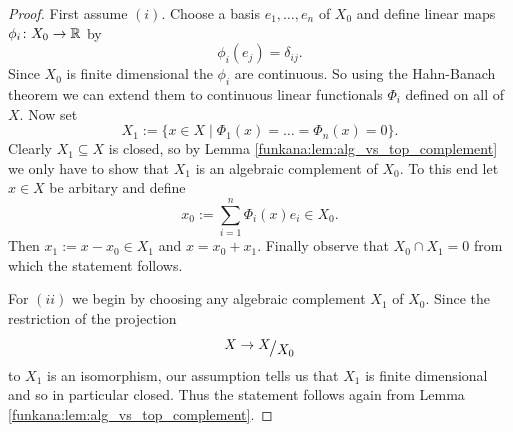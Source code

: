 \begin{proof}
    First assume $(i)$. Choose a basis $e_1,\ldots,e_n$ of $X_0$ and define linear maps $\phi_i \colon X_0 \to \mathbb{R}$ by 
    \[
    \phi_i(e_j) = \delta_{ij}.
    \]
    Since $X_0$ is finite dimensional the $\phi_i$ are continuous. So using the Hahn-Banach theorem we can extend them to continuous linear functionals $\Phi_i$ defined on all of $X$. Now set 
    \[
    X_1 := \{x \in X \mid \Phi_1(x) = \ldots = \Phi_n(x) = 0\}.
    \]
    Clearly $X_1\subseteq X$ is closed, so by Lemma \ref{funkana:lem:alg_vs_top_complement} we only have to show that $X_1$ is an algebraic complement of $X_0$. To this end let $x \in X$ be arbitary and define 
    \[
    x_0 := \sum_{i=1}^{n} \Phi_i(x)e_i \in X_0.
    \]
    Then $x_1 := x - x_0 \in X_1$ and $x = x_0 + x_1$. Finally observe that $X_0 \cap X_1 = 0$ from which the statement follows. 

    For $(ii)$ we begin by choosing any algebraic complement $X_1$ of $X_0$. Since the restriction of the projection
    \[
    X \to \modulo{X}{X_0}
    \]
    to $X_1$ is an isomorphism, our assumption tells us that $X_1$ is finite dimensional and so in particular closed. Thus the statement follows again from Lemma \ref{funkana:lem:alg_vs_top_complement}.
\end{proof}


